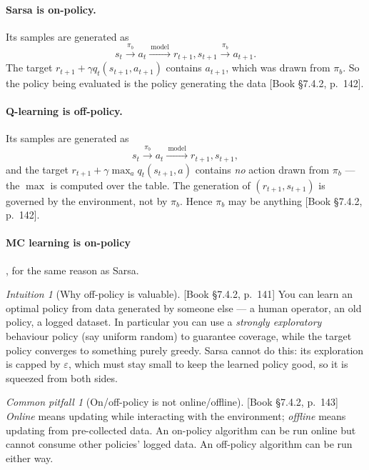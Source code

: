 \documentclass[11pt, letterpaper]{article}
\theoremstyle{runin}
\theoremstyle{runinplain}
\theoremstyle{remark}
\newtheorem*{warning}{Common pitfall}
\newtheorem*{intuition}{Intuition}
\newcommand{\bkin}[1]{{\color{bookblue}\small[\textsf{Book #1}]}}
\begin{document}
\paragraph{Sarsa is on-policy.} Its samples are generated as
\[
  s_t\xrightarrow{\ \pi_b\ }a_t\xrightarrow{\ \text{model}\ }r_{t+1},s_{t+1}
     \xrightarrow{\ \pi_b\ }a_{t+1}.
\]
The target $r_{t+1}+\gamma q_t(s_{t+1},a_{t+1})$ contains $a_{t+1}$, which was drawn
from $\pi_b$. So the policy being evaluated is the policy generating the data
\bkin{\S7.4.2, p.~142}.

\paragraph{Q-learning is off-policy.} Its samples are generated as
\[
  s_t\xrightarrow{\ \pi_b\ }a_t\xrightarrow{\ \text{model}\ }r_{t+1},s_{t+1},
\]
and the target $r_{t+1}+\gamma\max_a q_t(s_{t+1},a)$ contains \emph{no} action drawn
from $\pi_b$ --- the $\max$ is computed over the table. The generation of
$(r_{t+1},s_{t+1})$ is governed by the environment, not by $\pi_b$. Hence $\pi_b$ may
be anything \bkin{\S7.4.2, p.~142}.

\paragraph{MC learning is on-policy}, for the same reason as Sarsa.

\begin{intuition}[Why off-policy is valuable]
\bkin{\S7.4.2, p.~141} You can learn an optimal policy from data generated by
someone else --- a human operator, an old policy, a logged dataset. In particular
you can use a \emph{strongly exploratory} behaviour policy (say uniform random) to
guarantee coverage, while the target policy converges to something purely greedy.
Sarsa cannot do this: its exploration is capped by $\varepsilon$, which must stay
small to keep the learned policy good, so it is squeezed from both sides.
\end{intuition}

\begin{warning}[On/off-policy is not online/offline]
\bkin{\S7.4.2, p.~143} \emph{Online} means updating while interacting with the
environment; \emph{offline} means updating from pre-collected data. An on-policy
algorithm can be run online but cannot consume other policies' logged data. An
off-policy algorithm can be run either way.
\end{warning}
\end{document}
